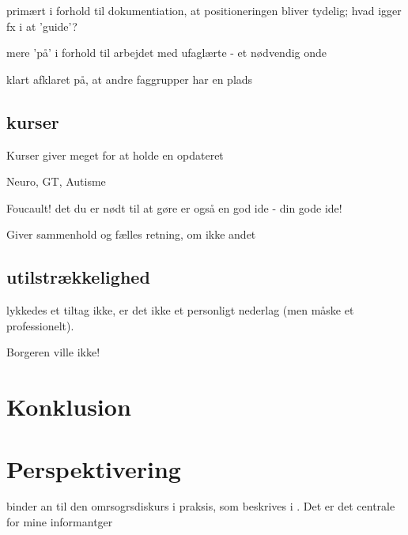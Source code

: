 primært i forhold til dokumentiation, at positioneringen bliver tydelig; hvad igger fx i at 'guide'?

mere 'på' i forhold til arbejdet med ufaglærte - et nødvendig onde

klart afklaret på, at andre faggrupper har en plads

\subsection{kurser}
Kurser giver meget for at holde en opdateret

Neuro, GT, Autisme

Foucault! det du er nødt til at gøre er også en god ide - din gode ide!

Giver sammenhold og fælles retning, om ikke andet

\subsection{utilstrækkelighed}
lykkedes et tiltag ikke, er det ikke et personligt nederlag (men måske et professionelt).

Borgeren ville ikke!

\section{Konklusion}

\section{Perspektivering}
binder an til den omrsogrsdiskurs i praksis, som beskrives i . Det er det centrale for mine informantger
